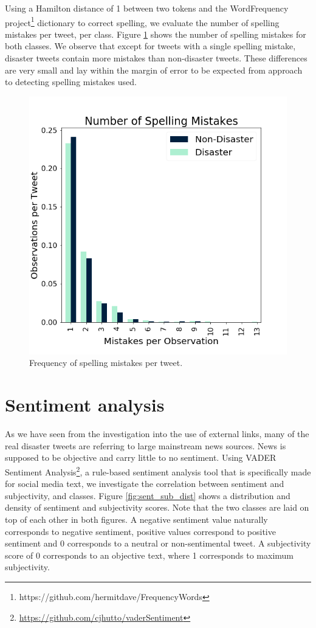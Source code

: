 \documentclass[journal, ]{IEEEtran}
\let\MYoriglatexcaption\caption
\renewcommand{\caption}[2][\relax]{\MYoriglatexcaption[#2]{#2}}
\begin{document}
Using a Hamilton distance of 1 between two tokens and the WordFrequency
project\footnote{https://github.com/hermitdave/FrequencyWords} dictionary to
correct spelling, we evaluate the number of spelling mistakes per tweet, per
class. Figure \ref{fig:spelling_mistakes} shows the number of spelling
mistakes for both classes. We observe that except for tweets with a single
spelling mistake, disaster tweets contain more mistakes than non-disaster
tweets. These differences are very small and lay within the margin of error to
be expected from approach to detecting spelling mistakes used. 

\begin{figure}[hbt!]
  \centering
  \includegraphics[width=0.9\linewidth]{../figures/spelling_mistakes.png}
  \caption{Frequency of spelling mistakes per tweet.}
  \label{fig:spelling_mistakes}
\end{figure}

\section{Sentiment analysis}
As we have seen from the investigation into the use of external links, many of
the real disaster tweets are referring to large mainstream news sources. News
is supposed to be objective and carry little to no sentiment. Using VADER
Sentiment Analysis\footnote{\url{https://github.com/cjhutto/vaderSentiment}}, a
rule-based sentiment analysis tool that is specifically made for social media
text, we investigate the correlation between sentiment and subjectivity, and
classes. Figure \ref{fig:sent_sub_dist} shows a distribution and density of
sentiment and subjectivity scores. Note that the two classes are laid on top of
each other in both figures. A negative sentiment value naturally corresponds to
negative sentiment, positive values correspond to positive sentiment and 0
corresponds to a neutral or non-sentimental tweet. A subjectivity score of 0
corresponds to an objective text, where 1 corresponds to maximum subjectivity.
\end{document}
